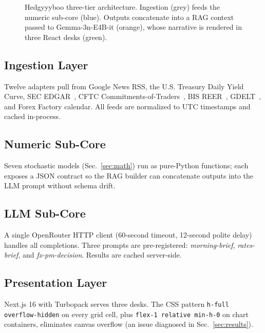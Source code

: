 \documentclass[conference]{IEEEtran}
\begin{document}
\begin{figure}[!t]
\caption{Hedgyyyboo three-tier architecture. Ingestion (grey) feeds the numeric sub-core (blue). Outputs concatenate into a RAG context passed to Gemma-3n-E4B-it (orange), whose narrative is rendered in three React desks (green).}
\label{fig:arch}
\end{figure}

\subsection{Ingestion Layer}
Twelve adapters pull from Google News RSS, the U.S. Treasury Daily Yield Curve, SEC EDGAR~\cite{secedgar}, CFTC Commitments-of-Traders~\cite{cftccot}, BIS REER~\cite{bisreer}, GDELT~\cite{gdelt2013}, and Forex Factory calendar. All feeds are normalized to UTC timestamps and cached in-process.

\subsection{Numeric Sub-Core}
Seven stochastic models (Sec.~\ref{sec:math}) run as pure-Python functions; each exposes a JSON contract so the RAG builder can concatenate outputs into the LLM prompt without schema drift.

\subsection{LLM Sub-Core}
A single OpenRouter HTTP client (60-second timeout, 12-second polite delay) handles all completions. Three prompts are pre-registered: \textit{morning-brief}, \textit{rates-brief}, and \textit{fx-pm-decision}. Results are cached server-side.

\subsection{Presentation Layer}
Next.js 16 with Turbopack serves three desks. The CSS pattern \texttt{h-full overflow-hidden} on every grid cell, plus \texttt{flex-1 relative min-h-0} on chart containers, eliminates canvas overflow (an issue diagnosed in Sec.~\ref{sec:results}).
\end{document}
